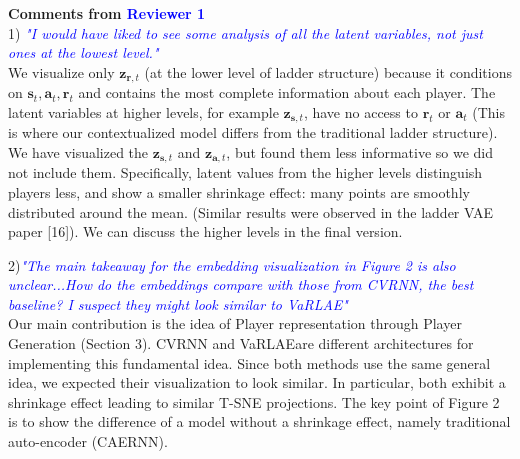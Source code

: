 \documentclass{article}
\newcommand{\latentvariables}{\mathbf{z}}
\newcommand{\state}{\mathbf{s}}
\newcommand{\action}{\mathbf{a}}
\newcommand{\reward}{\boldsymbol{r}}
\newcommand{\system}{VaRLAE\;}
\begin{document}
{\bf Comments from \textcolor{Blue}{Reviewer 1}}\\
1) \textcolor{Blue}{\it "I would have liked to see some analysis of all the latent variables, not just ones at the lowest level."}\\
We visualize only $\latentvariables_{\reward,t}$ (at the lower level of ladder structure) because it conditions on $\state_{t},\action_{t},\reward_{t}$ and contains the most complete information about each player. The latent variables at higher levels, for example $\latentvariables_{\state,t}$, have no access to $\reward_{t}$ or $\action_{t}$ (This is where our contextualized model differs from the traditional ladder structure). We have visualized the $\latentvariables_{\state,t}$ and $\latentvariables_{\action,t}$, but found them less informative so we did not include them. Specifically,  latent values from the higher levels distinguish players less, and show a smaller shrinkage effect:  many points are smoothly distributed around the mean. (Similar results were observed in the ladder VAE paper [16]). We can discuss the higher levels in the final version.


2)\textcolor{Blue}{\it "The main takeaway for the embedding visualization in Figure 2 is also unclear...How do the embeddings compare with those from CVRNN, the best baseline? I suspect they might look similar to VaRLAE"}\\
Our main contribution is the idea of Player representation through Player Generation (Section 3). CVRNN and \system are different architectures for implementing this fundamental idea. Since both methods use the same general idea, we expected their visualization to look similar. In particular, both exhibit a shrinkage effect leading to similar T-SNE projections. 
The key point of Figure 2 is to show the difference of a model without a shrinkage effect, namely traditional auto-encoder (CAERNN). 
\end{document}
